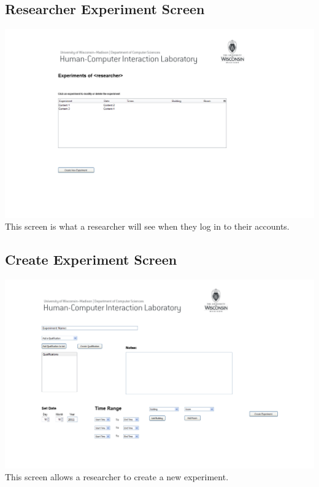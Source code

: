 \subsection{Researcher Experiment Screen}
\includegraphics[width=6in]{../other/User_Interface/Milestone_3/researcher_experiment_screen.png}\\
This screen is what a researcher will see when they log in to their accounts.

\subsection{Create Experiment Screen}
\includegraphics[width=6in]{../other/User_Interface/Milestone_3/researcher_create_experiment.png}\\
This screen allows a researcher to create a new experiment.

